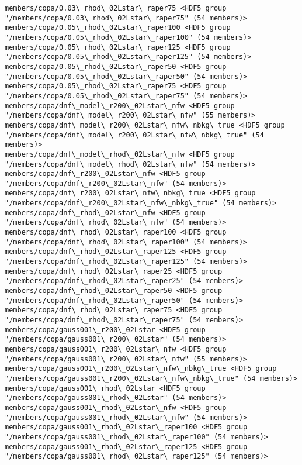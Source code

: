 \documentclass[11pt]{article}
\begin{document}
\begin{Verbatim}[commandchars=\\\{\}]
members/copa/0.03\_rhod\_02Lstar\_raper75 <HDF5 group "/members/copa/0.03\_rhod\_02Lstar\_raper75" (54 members)>
members/copa/0.05\_rhod\_02Lstar\_raper100 <HDF5 group "/members/copa/0.05\_rhod\_02Lstar\_raper100" (54 members)>
members/copa/0.05\_rhod\_02Lstar\_raper125 <HDF5 group "/members/copa/0.05\_rhod\_02Lstar\_raper125" (54 members)>
members/copa/0.05\_rhod\_02Lstar\_raper50 <HDF5 group "/members/copa/0.05\_rhod\_02Lstar\_raper50" (54 members)>
members/copa/0.05\_rhod\_02Lstar\_raper75 <HDF5 group "/members/copa/0.05\_rhod\_02Lstar\_raper75" (54 members)>
members/copa/dnf\_model\_r200\_02Lstar\_nfw <HDF5 group "/members/copa/dnf\_model\_r200\_02Lstar\_nfw" (55 members)>
members/copa/dnf\_model\_r200\_02Lstar\_nfw\_nbkg\_true <HDF5 group "/members/copa/dnf\_model\_r200\_02Lstar\_nfw\_nbkg\_true" (54 members)>
members/copa/dnf\_model\_rhod\_02Lstar\_nfw <HDF5 group "/members/copa/dnf\_model\_rhod\_02Lstar\_nfw" (54 members)>
members/copa/dnf\_r200\_02Lstar\_nfw <HDF5 group "/members/copa/dnf\_r200\_02Lstar\_nfw" (54 members)>
members/copa/dnf\_r200\_02Lstar\_nfw\_nbkg\_true <HDF5 group "/members/copa/dnf\_r200\_02Lstar\_nfw\_nbkg\_true" (54 members)>
members/copa/dnf\_rhod\_02Lstar\_nfw <HDF5 group "/members/copa/dnf\_rhod\_02Lstar\_nfw" (54 members)>
members/copa/dnf\_rhod\_02Lstar\_raper100 <HDF5 group "/members/copa/dnf\_rhod\_02Lstar\_raper100" (54 members)>
members/copa/dnf\_rhod\_02Lstar\_raper125 <HDF5 group "/members/copa/dnf\_rhod\_02Lstar\_raper125" (54 members)>
members/copa/dnf\_rhod\_02Lstar\_raper25 <HDF5 group "/members/copa/dnf\_rhod\_02Lstar\_raper25" (54 members)>
members/copa/dnf\_rhod\_02Lstar\_raper50 <HDF5 group "/members/copa/dnf\_rhod\_02Lstar\_raper50" (54 members)>
members/copa/dnf\_rhod\_02Lstar\_raper75 <HDF5 group "/members/copa/dnf\_rhod\_02Lstar\_raper75" (54 members)>
members/copa/gauss001\_r200\_02Lstar <HDF5 group "/members/copa/gauss001\_r200\_02Lstar" (54 members)>
members/copa/gauss001\_r200\_02Lstar\_nfw <HDF5 group "/members/copa/gauss001\_r200\_02Lstar\_nfw" (55 members)>
members/copa/gauss001\_r200\_02Lstar\_nfw\_nbkg\_true <HDF5 group "/members/copa/gauss001\_r200\_02Lstar\_nfw\_nbkg\_true" (54 members)>
members/copa/gauss001\_rhod\_02Lstar <HDF5 group "/members/copa/gauss001\_rhod\_02Lstar" (54 members)>
members/copa/gauss001\_rhod\_02Lstar\_nfw <HDF5 group "/members/copa/gauss001\_rhod\_02Lstar\_nfw" (54 members)>
members/copa/gauss001\_rhod\_02Lstar\_raper100 <HDF5 group "/members/copa/gauss001\_rhod\_02Lstar\_raper100" (54 members)>
members/copa/gauss001\_rhod\_02Lstar\_raper125 <HDF5 group "/members/copa/gauss001\_rhod\_02Lstar\_raper125" (54 members)>

\end{Verbatim}
\end{document}
